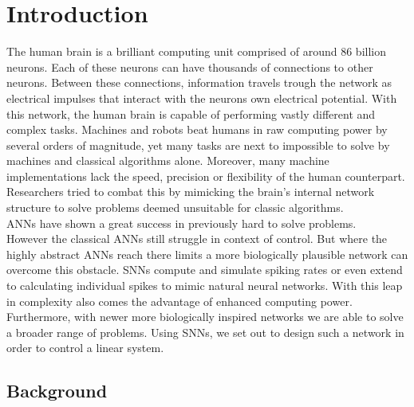 \chapter{Introduction}

The human brain is a brilliant computing unit comprised of around 86 billion\cite{azevedo_equal_2009} neurons. Each of these neurons can have thousands of connections to other neurons. Between these connections, information travels trough the network as electrical impulses that interact with the neurons own electrical potential. With this network, the human brain is capable of performing vastly different and complex tasks. Machines and robots beat humans in raw computing power by several orders of magnitude, yet many tasks are next to impossible to solve by machines and classical algorithms alone. Moreover, many machine implementations lack the speed, precision or flexibility of the human counterpart.\\
Researchers tried to combat this by mimicking the brain's internal network structure to solve problems deemed unsuitable for classic algorithms.\\
\acp{ANN} have shown a great success in previously hard to solve problems.\\
However the classical \acp{ANN} still struggle in context of control.
But where the highly abstract \acp{ANN} reach there limits a more biologically plausible network can overcome this obstacle.
\acp{SNN} compute and simulate spiking rates or even extend to calculating individual spikes to mimic natural neural networks. With this leap in complexity also comes the advantage of enhanced computing power. Furthermore, with newer more biologically inspired networks we are able to solve a broader range of problems. Using \acp{SNN}, we set out to design such a network in order to control a linear system.  \\

\section{Background}\label{sec:background}

